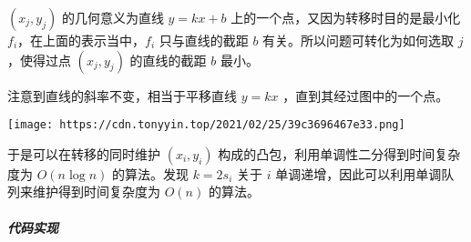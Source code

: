 \((x_j, y_j)\) 的几何意义为直线 \(y=kx+b\)
上的一个点，又因为转移时目的是最小化 \(f_i\)，在上面的表示当中，\(f_i\)
只与直线的截距 \(b\) 有关。所以问题可转化为如何选取 \(j\) ，使得过点
\((x_j, y_j)\) 的直线的截距 \(b\) 最小。

注意到直线的斜率不变，相当于平移直线 \(y=kx\) ，直到其经过图中的一个点。

\texttt{[image: https://cdn.tonyyin.top/2021/02/25/39c3696467e33.png]}

于是可以在转移的同时维护 \((x_i,y_i)\)
构成的凸包，利用单调性二分得到时间复杂度为 \(O(n\log n)\) 的算法。发现
\(k=2s_i\) 关于 \(i\)
单调递增，因此可以利用单调队列来维护得到时间复杂度为 \(O(n)\) 的算法。

\subparagraph{代码实现}

\begin{Shaded}
\begin{Highlighting}[]
\PreprocessorTok{ }
 \OperatorTok{;}
 \OperatorTok{=}  \OperatorTok{+} \OperatorTok{;}
\OperatorTok{,}\OperatorTok{;}
\OperatorTok{[}\OperatorTok{],}\OperatorTok{[}\OperatorTok{],}\OperatorTok{[}\OperatorTok{];}
\OperatorTok{(}\OperatorTok{,} \OperatorTok{)} \OperatorTok{\{}
     \OperatorTok{((}\OperatorTok{[}\OperatorTok{]+(}\OperatorTok{[}\OperatorTok{]+}\OperatorTok{)*(}\OperatorTok{[}\OperatorTok{]+}\OperatorTok{))} \OperatorTok{{-}} \OperatorTok{(}\OperatorTok{[}\OperatorTok{]+(}\OperatorTok{[}\OperatorTok{]+}\OperatorTok{)*(}\OperatorTok{[}\OperatorTok{]+}\OperatorTok{)))} \OperatorTok{/} \OperatorTok{(}\OperatorTok{)(}\OperatorTok{[}\OperatorTok{]} \OperatorTok{{-}}\OperatorTok{[}\OperatorTok{]);}
\OperatorTok{\}}
\OperatorTok{,}\OperatorTok{,}\OperatorTok{[}\OperatorTok{];}

\end{Highlighting}
\end{Shaded}
